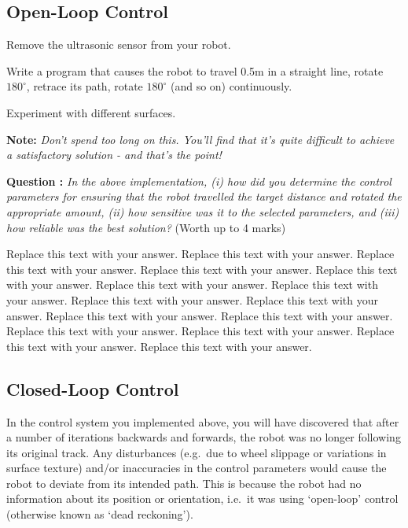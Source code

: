 \documentclass[hidelinks,a4paper,11pt]{article}
\newcounter{question}
\newcommand\myq{\refstepcounter{question}\thequestion}
\begin{document}
\subsection{Open-Loop Control}

\begin{todolist}
	\item Remove the ultrasonic sensor from your robot.
	\item Write a program that causes the robot to travel 0.5m in a straight line, rotate $180^{\circ}$, retrace its path, rotate $180^{\circ}$ (and so on) continuously.
	\item Experiment with different surfaces.
\end{todolist}

{\bfseries Note:}  \emph{Don't spend too long on this.  You'll find that it's quite difficult to achieve a satisfactory solution - and that's the point!}

{\bfseries Question \myq:}  \emph{In the above implementation, (i) how did you determine the control parameters for ensuring that the robot travelled the target distance and rotated the appropriate amount, (ii) how sensitive was it to the selected parameters, and (iii) how reliable was the best solution?} (Worth up to 4 marks)\\
\begin{mdframed}
Replace this text with your answer.  Replace this text with your answer.  Replace this text with your answer.  Replace this text with your answer.  Replace this text with your answer.  Replace this text with your answer.  Replace this text with your answer.  Replace this text with your answer.  Replace this text with your answer.  Replace this text with your answer.  Replace this text with your answer.  Replace this text with your answer.  Replace this text with your answer.  Replace this text with your answer.  Replace this text with your answer.
\end{mdframed}
\vspace*{\baselineskip}


\subsection{Closed-Loop Control}

In the control system you implemented above, you will have discovered that after a number of iterations backwards and forwards, the robot was no longer following its original track.  Any disturbances (e.g.\ due to wheel slippage or variations in surface texture) and/or inaccuracies in the control parameters would cause the robot to deviate from its intended path.  This is because the robot had no information about its position or orientation, i.e.\ it was using `open-loop' control (otherwise known as `dead reckoning').
\end{document}
